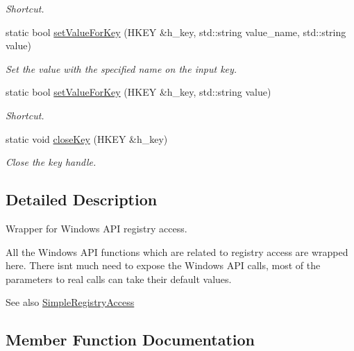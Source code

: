 \begin{DoxyCompactItemize}
\begin{DoxyCompactList}\small\item\em Shortcut. \end{DoxyCompactList}\item 
static bool \hyperlink{class_direct_registry_access_a9a80842fdb2b503215fe757632d0448b}{set\+Value\+For\+Key} (H\+K\+E\+Y \&h\+\_\+key, std\+::string value\+\_\+name, std\+::string value)
\begin{DoxyCompactList}\small\item\em Set the value with the specified name on the input key. \end{DoxyCompactList}\item 
static bool \hyperlink{class_direct_registry_access_a7d09201af3a73bc290d6334fdd09ea6b}{set\+Value\+For\+Key} (H\+K\+E\+Y \&h\+\_\+key, std\+::string value)
\begin{DoxyCompactList}\small\item\em Shortcut. \end{DoxyCompactList}\item 
static void \hyperlink{class_direct_registry_access_a05d4a5bbed79beba121eddf512fda0a0}{close\+Key} (H\+K\+E\+Y \&h\+\_\+key)
\begin{DoxyCompactList}\small\item\em Close the key handle. \end{DoxyCompactList}\end{DoxyCompactItemize}


\subsection{Detailed Description}
Wrapper for Windows A\+P\+I registry access. 

All the Windows A\+P\+I functions which are related to registry access are wrapped here. There isn\textquotesingle{}t much need to expose the Windows A\+P\+I calls, most of the parameters to real calls can take their default values.

\begin{DoxySeeAlso}{See also}
\hyperlink{class_simple_registry_access}{Simple\+Registry\+Access} 
\end{DoxySeeAlso}


\subsection{Member Function Documentation}
\hypertarget{class_direct_registry_access_a05d4a5bbed79beba121eddf512fda0a0}{}
